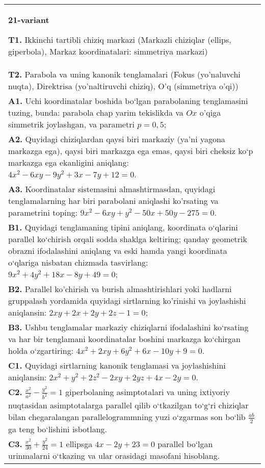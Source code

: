 \documentclass{article}
\begin{document}
\begin{tabular}{m{17cm}}
\textbf{21-variant}
\newline

\textbf{T1.} Ikkinchi tartibli chiziq markazi (Markazli chiziqlar (ellips, giperbola), Markaz koordinatalari: simmetriya markazi) \\
\textbf{T2.} Parabola va uning kanonik tenglamalari (Fokus (yo’naluvchi nuqta), Direktrisa (yo’naltiruvchi chiziq), O’q (simmetriya o’qi)) \\
\textbf{A1.} Uchi koordinatalar boshida bo‘lgan parabolaning tenglamasini tuzing, bunda: parabola chap yarim tekislikda va $Ox$ o'qiga simmetrik joylashgan, va parametri $p=0,5$; \\
\textbf{A2.} Quyidagi chiziqlardan qaysi biri markaziy (ya’ni yagona markazga ega), qaysi biri markazga ega emas, qaysi biri cheksiz ko‘p markazga ega ekanligini aniqlang: $4 x^2-6 x y-9 y^2+3 x-7 y+12=0$. \\
\textbf{A3.} Koordinatalar sistemasini almashtirmasdan, quyidagi tenglamalarning har biri parabolani aniqlashi ko'rsating va parametrini toping: $9 x^2-6 x y+y^2-50 x+50 y-275=0$. \\
\textbf{B1.} Quyidagi tenglamaning tipini aniqlang, koordinata o‘qlarini parallel ko‘chirish orqali sodda shaklga keltiring; qanday geometrik obrazni ifodalashini aniqlang va eski hamda yangi koordinata o‘qlariga nisbatan chizmada tasvirlang: $9 x^2+4 y^2+18 x-8 y+49=0$; \\
\textbf{B2.} Parallel ko'chirish va burish almashtirishlari yoki hadlarni gruppalash yordamida quyidagi sirtlarning ko'rinishi va joylashishi aniqlansin: $2 x y+2 x+2 y+2 z-1=0$; \\
\textbf{B3.} Ushbu tenglamalar markaziy chiziqlarni ifodalashini ko‘rsating va har bir tenglamani koordinatalar boshini markazga ko‘chirgan holda o‘zgartiring: $4 x^2+2 x y+6 y^2+6 x-10 y+9=0$. \\
\textbf{C1.} Quyidagi sirtlarning kanonik tenglamasi va joylashishini aniqlansin: $2 x^2+y^2+2 z^2-2 x y+2 y z+4 x-2 y=0$. \\
\textbf{C2.} $\frac{x^2}{a^2}-\frac{y^2}{b^2}=1$ giperbolaning asimptotalari va uning ixtiyoriy nuqtasidan asimptotalarga parallel qilib o‘tkazilgan to‘g‘ri chiziqlar bilan chegaralangan parallelogrammning yuzi o‘zgarmas son bo‘lib $\frac{a b}{2}$ ga teng bo‘lishini isbotlang. \\
\textbf{C3.} $\frac{x^2}{30}+\frac{y^2}{24}=1$ ellipsga $4x-2y+23=0$ parallel bo‘lgan urinmalarni o‘tkazing va ular orasidagi masofani hisoblang. \\

\end{tabular}
\vspace{1cm}
\end{document}

